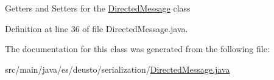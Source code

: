 Getters and Setters for the \hyperlink{classes_1_1deusto_1_1serialization_1_1_directed_message}{Directed\+Message} class 

Definition at line 36 of file Directed\+Message.\+java.



The documentation for this class was generated from the following file\+:\begin{DoxyCompactItemize}
\item 
src/main/java/es/deusto/serialization/\hyperlink{_directed_message_8java}{Directed\+Message.\+java}\end{DoxyCompactItemize}
